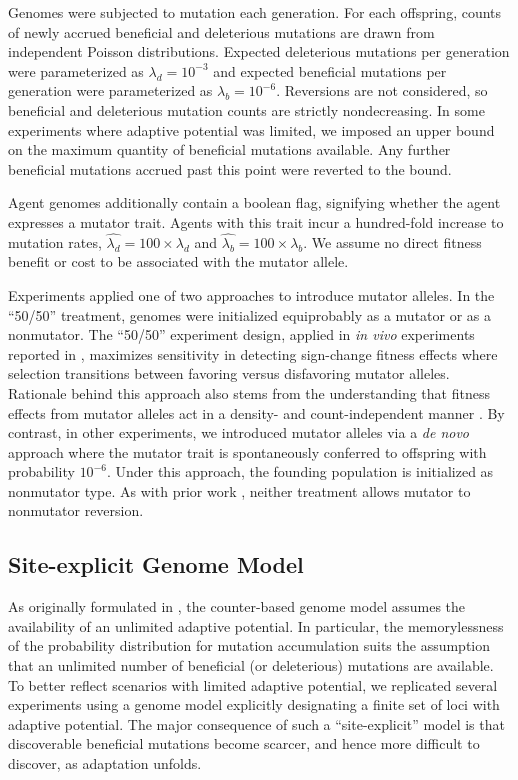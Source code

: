 Genomes were subjected to mutation each generation.
For each offspring, counts of newly accrued beneficial and deleterious mutations are drawn from independent Poisson distributions.
Expected deleterious mutations per generation were parameterized as
$\lambda_d=10^{-3}$ and expected beneficial mutations per generation were parameterized as $\lambda_b=10^{-6}$.
Reversions are not considered, so beneficial and deleterious mutation counts are strictly nondecreasing.
In some experiments where adaptive potential was limited, we imposed an upper bound on the maximum quantity of beneficial mutations available.
Any further beneficial mutations accrued past this point were reverted to the bound.

Agent genomes additionally contain a boolean flag, signifying whether the agent expresses a mutator trait.
Agents with this trait incur a hundred-fold increase to mutation rates, $\hat{\lambda_d} = 100 \times \lambda_d$ and $\hat{\lambda_b} = 100 \times \lambda_b$.
We assume no direct fitness benefit or cost to be associated with the mutator allele.

Experiments applied one of two approaches to introduce mutator alleles.
In the ``50/50'' treatment, genomes were initialized equiprobably as a mutator or as a nonmutator.
The ``50/50'' experiment design, applied in \textit{in vivo} experiments reported in \citet{raynes2018sign}, maximizes sensitivity in detecting sign-change fitness effects where selection transitions between favoring versus disfavoring mutator alleles.
Rationale behind this approach also stems from the understanding that fitness effects from mutator alleles act in a density- and count-independent manner \citep{raynes2019selection}.
By contrast, in other experiments, we introduced mutator alleles via a \textit{de novo} approach where the mutator trait is spontaneously conferred to offspring with probability $10^{-6}$.
Under this approach, the founding population is initialized as nonmutator type.
As with prior work \citep{raynes2018sign}, neither treatment allows mutator to nonmutator reversion.

\subsection{Site-explicit Genome Model} \label{sec:site-explicit}
As originally formulated in \citet{raynes2018sign}, the counter-based genome model assumes the availability of an unlimited adaptive potential.
In particular, the memorylessness of the probability distribution for mutation accumulation suits the assumption that an unlimited number of beneficial (or deleterious) mutations are available.
To better reflect scenarios with limited adaptive potential, we replicated several experiments using a genome model explicitly designating a finite set of loci with adaptive potential.
The major consequence of such a ``site-explicit'' model is that discoverable beneficial mutations become scarcer, and hence more difficult to discover, as adaptation unfolds.

